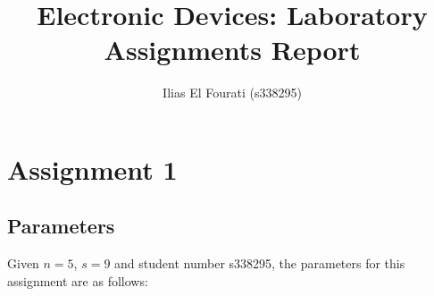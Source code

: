 \documentclass{book}
\title{Electronic Devices: Laboratory Assignments Report}
\author{Ilias El Fourati (s338295)}
\date{}
\begin{document}
    \maketitle

    \chapter*{Assignment 1}

        \vspace{10pt}
        \section{Parameters}
            Given $n = 5$, $s = 9$ and student number s338295, the parameters for this assignment are as follows:
\end{document}
